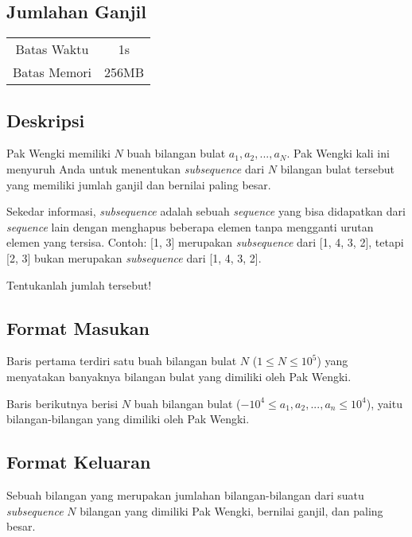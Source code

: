 \documentclass{article}
\begin{document}
\begin{center}
    \section*{Jumlahan Ganjil}

    \begin{tabular}{ | c c | }
        \hline
        Batas Waktu  & 1s \\    %
        Batas Memori & 256MB \\  %
        \hline
    \end{tabular}
\end{center}

\subsection*{Deskripsi}

Pak Wengki memiliki $N$ buah bilangan bulat $a_1, a_2, ..., a_N$. Pak Wengki kali ini menyuruh Anda untuk menentukan \textit{subsequence} dari $N$ bilangan bulat tersebut yang memiliki jumlah ganjil dan bernilai paling besar. 

Sekedar informasi, \textit{subsequence} adalah sebuah \textit{sequence} yang bisa didapatkan dari \textit{sequence} lain dengan menghapus beberapa elemen tanpa mengganti urutan elemen yang tersisa.
Contoh: [1, 3] merupakan \textit{subsequence} dari [1, 4, 3, 2], tetapi [2, 3] bukan merupakan \textit{subsequence} dari [1, 4, 3, 2].

Tentukanlah jumlah tersebut!

\subsection*{Format Masukan}

Baris pertama terdiri satu buah bilangan bulat $N$ ($1 \leq N \leq 10^5$) yang menyatakan banyaknya bilangan bulat yang dimiliki oleh Pak Wengki.

Baris berikutnya berisi $N$ buah bilangan bulat ($-10^4 \leq a_1, a_2, ..., a_n \leq 10^4$), yaitu bilangan-bilangan yang dimiliki oleh Pak Wengki.

\subsection*{Format Keluaran}

Sebuah bilangan yang merupakan jumlahan bilangan-bilangan dari suatu \textit{subsequence} $N$ bilangan yang dimiliki Pak Wengki, bernilai ganjil, dan paling besar.
\end{document}
